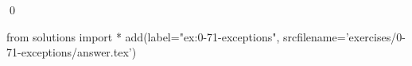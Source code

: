 
\begin{ex}
  \label{ex:0-71-exceptions}
  
  \qed
\end{ex}
\begin{python0}
from solutions import *
add(label="ex:0-71-exceptions",
    srcfilename='exercises/0-71-exceptions/answer.tex')
\end{python0}
